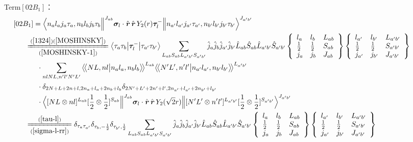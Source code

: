 \documentclass[master]{shnuthesis}
\newcommand{\llangle}{\big\langle\!\big\langle}
\newcommand{\rrangle}{\big\rangle\!\big\rangle}
\newcommand{\bmr}{\textbf{\textit{r}}}
\newcommand{\ap}{a^\prime}
\newcommand{\bp}{b^\prime}
\newcommand{\il}{\!\!\!\!\!\!\!\!\!\!}
\newcommand{\ii}{\!\!\!\!\!\!\!\!\!\!\!\!\!\!\!\!\!\!\!\!}
\newcommand{\zdydh}{\xlongequal}
\begin{document}
\,\\
{\color{red}Term$[02B_1]$：}
\begin{align}
    &\ii [02B_1] = \Big\langle n_a l_a j_a \tau_a, n_b l_b j_b \tau_b \Big\|^{J_{ab}} \bm{\sigma}_l\cdot\hat{\bmr}\,\hat{\bmr}\, Y_2(r) \bm{\tau}_l^- \Big\| n_{\ap} l_{\ap} j_{\ap} \tau_{\ap}, n_{\bp} l_{\bp} j_{\bp} \tau_{\bp} \Big\rangle^{J_{\ap \bp}} \\
    &\il \zdydh[(\ref{MOSHINSKY-1})]{(\ref{1324})(\ref{MOSHINSKY})} \big\langle \tau_a\tau_b \big|\bm{\tau}_l^- \big|\tau_{\ap}\tau_{\bp}\big\rangle \sum_{L_{ab}S_{ab}L_{\ap\bp}S_{\ap\bp}} \hat{j}_a\hat{j}_b\hat{j}_{\ap}\hat{j}_{\bp}\hat{L}_{ab}\hat{S}_{ab}\hat{L}_{\ap\bp}\hat{S}_{\ap\bp}  \left\{\begin{array}{lll}l_{a} & l_{b} & L_{ab} \\ \frac{1}{2} & \frac{1}{2} & S_{ab} \\j_{a} & j_{b} & J_{ab} \end{array}\right\} \left\{\begin{array}{lll}l_{\ap} & l_{\bp} & L_{\ap\bp} \\ \frac{1}{2} & \frac{1}{2} & S_{\ap\bp} \\j_{\ap} & j_{\bp} & J_{\ap\bp} \end{array}\right\}  \notag \\
    & \cdot \sum_{nlNL,n^\prime l^\prime N^\prime L^\prime} \llangle N L, n l \big| n_{a} l_{a}, n_{b} l_{b} \rrangle^{L_{ab}} \llangle N^\prime L^\prime, n^\prime l^\prime \big| n_{a^\prime} l_{a^\prime}, n_{b^\prime} l_{b^\prime} \rrangle^{L_{\ap\bp}} \notag\\
    & \cdot \delta_{2N+L+2n+l,2n_a+l_a+2n_b+l_b}\delta_{2N^\prime+L^\prime+2n^\prime+l^\prime,2n_{a^\prime}+l_{a^\prime}+2n_{b^\prime}+l_{b^\prime}}  \notag\\
    & \cdot \Big\langle [N L \otimes n l]^{L_{ab}} [\frac{1}{2}\otimes\frac{1}{2}]^{S_{ab}} \Big\|^{J_{ab}} \bm{\sigma}_l\cdot\hat{\bmr}\,\hat{\bmr}\, Y_2(\sqrt{2}r) \Big\| [N^\prime L^\prime \otimes n^\prime l^\prime]^{L_{\ap\bp}} [\frac{1}{2}\otimes\frac{1}{2}]^{S_{\ap\bp}} \Big\rangle^{J_{\ap \bp}} \\
    &\il \zdydh[(\ref{sigma-l-rr})]{(\ref{tau-l})} \delta_{\tau_a \tau_{\ap}}\delta_{\tau_b, -\frac{1}{2}}\delta_{\tau_{\bp}, \frac{1}{2}} \sum_{L_{ab}S_{ab}L_{\ap\bp}S_{\ap\bp}} \hat{j}_a\hat{j}_b\hat{j}_{\ap}\hat{j}_{\bp}\hat{L}_{ab}\hat{S}_{ab}\hat{L}_{\ap\bp}\hat{S}_{\ap\bp}  \left\{\begin{array}{lll}l_{a} & l_{b} & L_{ab} \\ \frac{1}{2} & \frac{1}{2} & S_{ab} \\j_{a} & j_{b} & J_{ab} \end{array}\right\} \left\{\begin{array}{lll}l_{\ap} & l_{\bp} & L_{\ap\bp} \\ \frac{1}{2} & \frac{1}{2} & S_{\ap\bp} \\j_{\ap} & j_{\bp} & J_{\ap\bp} \end{array}\right\}  \notag \\

\end{align}
\end{document}
